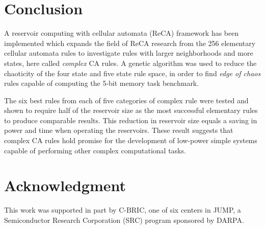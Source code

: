 \documentclass{elsarticle}
\begin{document}
\begin{multicols}{2}
	\section{Conclusion}\label{conclusion}
	A reservoir computing with cellular automata (ReCA) framework has been 
	implemented which expands the field of ReCA research from the 256 elementary 
	cellular automata rules to investigate rules with larger neighborhoods and more 
	states, here called \textit{complex} CA rules. A genetic algorithm was used to 
	reduce the chaoticity of the four state and five state rule space, in order to 
	find \textit{edge of chaos} rules capable of computing the 5-bit memory task 
	benchmark. \par The six best rules from each of five categories of complex rule 
	were tested and shown to require half of the reservoir size as the most 
	successful elementary rules to produce comparable results. This reduction in 
	reservoir size equals a saving in power and time when operating the reservoirs.  
	These result suggests that complex CA rules hold promise for the development of 
	low-power simple systems capable of performing other complex computational 
	tasks.  
	
	
	\section{Acknowledgment}
	This work was supported in part by C-BRIC, one of six centers in JUMP, a 
	Semiconductor Research Corporation (SRC) program sponsored by DARPA.
	
	
	
\end{multicols}
\end{document}
